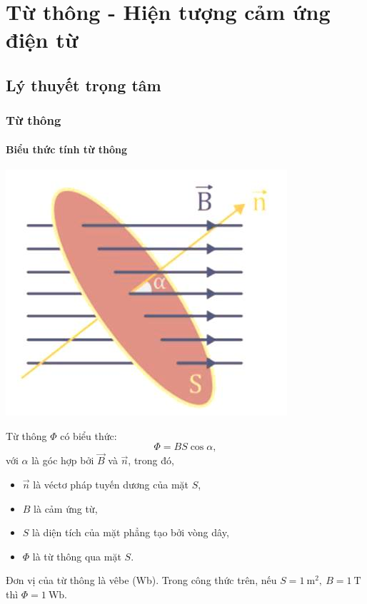 \chapter{Từ thông - Hiện tượng cảm ứng điện từ}
\section{Lý thuyết trọng tâm}
\subsection{Từ thông}
\subsubsection{Biểu thức tính từ thông}
\begin{center}
	\includegraphics[scale=0.6]{../figs/VN11-PH-29-L-020-1-h63.jpg}
\end{center}
Từ thông $\Phi$ có biểu thức:
\begin{equation}
\Phi=BS\cos \alpha,
\end{equation}
với $\alpha$ là góc hợp bởi $\vec{B}$ và $\vec{n}$, trong đó,
\begin{itemize}
	\item $\vec{n}$ là véctơ pháp tuyến dương của mặt $S$,
	\item $B$ là cảm ứng từ, 
	\item $S$ là diện tích của mặt phẳng tạo bởi vòng dây,
	\item $\Phi$ là từ thông qua mặt $S$. 
\end{itemize}

Đơn vị của từ thông là vêbe (Wb). Trong công thức trên, nếu $S=1\ \text{m}^2, \ B=1\ \text{T}$ thì $\Phi=1\ \text{Wb}$.

